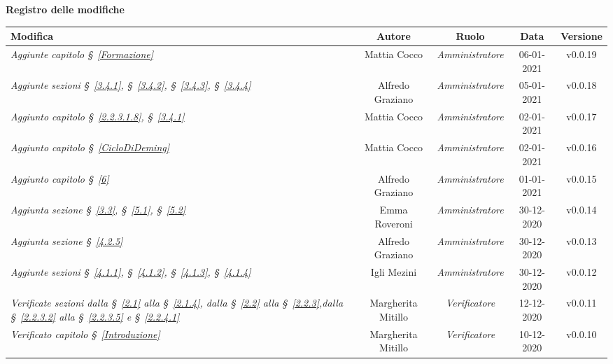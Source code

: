 \quad
\begin{center}
	\LARGE\textbf{Registro delle modifiche}
\end{center}

\def\tabularxcolumn#1{m{#1}}
{

\begin{center}
		\renewcommand{\arraystretch}{1.4}
	\begin{tabularx}{\textwidth}{|X|c|c|c|c|}
		\hline
		\rowcolor{airforceblue}
		\textbf{Modifica} & \textbf{Autore} & \textbf{Ruolo} & \textbf{Data} & \textbf{Versione}
		\\
		\hline
		\textit{Aggiunte capitolo \S~\ref{Formazione}} & Mattia Cocco & \textit{Amministratore} & 06-01-2021 & v0.0.19
		\\
		\hline
		\textit{Aggiunte sezioni \S~\ref{3.4.1}, \S~\ref{3.4.2}, \S~\ref{3.4.3}, \S~\ref{3.4.4}} & Alfredo Graziano & \textit{Amministratore} & 05-01-2021 & v0.0.18
		\\
		\hline
		\textit{Aggiunto capitolo \S~\ref{2.2.3.1.8}, \S~\ref{3.4.1}} & Mattia Cocco & \textit{Amministratore} & 02-01-2021 & v0.0.17	
		\\
		\hline
		\textit{Aggiunto capitolo \S~\ref{CicloDiDeming}} & Mattia Cocco & \textit{Amministratore} & 02-01-2021 & v0.0.16
		\\
		\hline
		\textit{Aggiunto capitolo \S~\ref{6}} & Alfredo Graziano & \textit{Amministratore} & 01-01-2021 & v0.0.15
		\\
		\hline
		\textit{Aggiunta sezione \S~\ref{3.3}, \S~\ref{5.1}, \S~\ref{5.2}} & Emma Roveroni & \textit{Amministratore} & 30-12-2020 & v0.0.14
		\\
		\hline
		\textit{Aggiunta sezione \S~\ref{4.2.5} } & Alfredo Graziano & \textit{Amministratore} & 30-12-2020 & v0.0.13
		\\
		\hline
		\textit{Aggiunte sezioni \S~\ref{4.1.1}, \S~\ref{4.1.2}, \S~\ref{4.1.3}, \S~\ref{4.1.4} } & Igli Mezini & \textit{Amministratore} & 30-12-2020 & v0.0.12
		\\
		\hline
		\textit{Verificate sezioni dalla \S~\ref{2.1} alla \S~\ref{2.1.4}, dalla \S~\ref{2.2} alla \S~\ref{2.2.3},dalla \S~\ref{2.2.3.2} alla \S~\ref{2.2.3.5} e \S~\ref{2.2.4.1}} & Margherita Mitillo & \textit{Verificatore} & 12-12-2020 & v0.0.11
		\\
		\hline
		\textit{Verificato capitolo \S~\ref{Introduzione}} & Margherita Mitillo & \textit{Verificatore} & 10-12-2020 & v0.0.10
		\\

\end{tabularx}
\end{center}}

